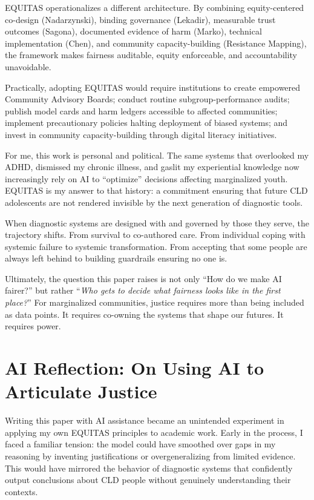 \documentclass[12pt,a4paper]{article}
\begin{document}
EQUITAS operationalizes a different architecture. By combining equity-centered co-design (Nadarzynski), binding governance (Lekadir), measurable trust outcomes (Sagona), documented evidence of harm (Marko), technical implementation (Chen), and community capacity-building (Resistance Mapping), the framework makes fairness auditable, equity enforceable, and accountability unavoidable.

Practically, adopting EQUITAS would require institutions to create empowered Community Advisory Boards; conduct routine subgroup-performance audits; publish model cards and harm ledgers accessible to affected communities; implement precautionary policies halting deployment of biased systems; and invest in community capacity-building through digital literacy initiatives.

For me, this work is personal and political. The same systems that overlooked my ADHD, dismissed my chronic illness, and gaslit my experiential knowledge now increasingly rely on AI to ``optimize'' decisions affecting marginalized youth. EQUITAS is my answer to that history: a commitment ensuring that future CLD adolescents are not rendered invisible by the next generation of diagnostic tools.

When diagnostic systems are designed with and governed by those they serve, the trajectory shifts. From survival to co-authored care. From individual coping with systemic failure to systemic transformation. From accepting that some people are always left behind to building guardrails ensuring no one is.

Ultimately, the question this paper raises is not only ``How do we make AI fairer?'' but rather ``\textit{Who gets to decide what fairness looks like in the first place?}'' For marginalized communities, justice requires more than being included as data points. It requires co-owning the systems that shape our futures. It requires power.

\newpage
\section*{AI Reflection: On Using AI to Articulate Justice}

Writing this paper with AI assistance became an unintended experiment in applying my own EQUITAS principles to academic work. Early in the process, I faced a familiar tension: the model could have smoothed over gaps in my reasoning by inventing justifications or overgeneralizing from limited evidence. This would have mirrored the behavior of diagnostic systems that confidently output conclusions about CLD people without genuinely understanding their contexts.
\end{document}
